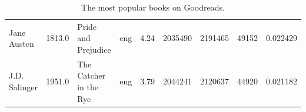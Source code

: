 \documentclass[handout]{beamer}
\begin{document}
\begin{frame}
\begin{table}
\begin{tabular}{lHlHHHHHZ}
                 Jane Austen &                     1813.0 &                                Pride and Prejudice &           eng &            4.24 &        2035490 &             2191465 &                    49152 &       0.022429 \\
               J.D. Salinger &                     1951.0 &                             The Catcher in the Rye &           eng &            3.79 &        2044241 &             2120637 &                    44920 &       0.021182 \\
\bottomrule
\end{tabular}
    \caption[Most Rated Books]{The most popular books on Goodreads.}
     \label{tbl:most-rated-books}
\end{table}


\end{frame}
\end{document}
